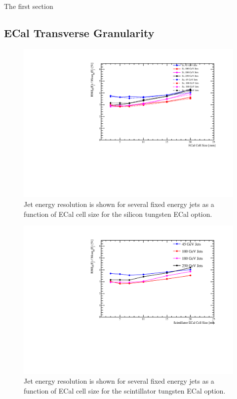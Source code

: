 The first section

\subsection{ECal Transverse Granularity}
\label{optstud:sec:ecal:cellsize}

\begin{figure}
  \includegraphics[width=\largefigwidth]{OptimisationStudies/Plots/JER_vs_SiliconECalCellSize.pdf}
  \caption[Jet energy resolution as a function of ECal cell size for the silicon tungsten ECal option.]{Jet energy resolution is shown for several fixed energy jets as a function of ECal cell size for the silicon tungsten ECal option.}
  \label{optstud:fig:siecalcells}
\end{figure}

\begin{figure}
  \includegraphics[width=\largefigwidth]{OptimisationStudies/Plots/JER_vs_ScintillatorECalCellSize.pdf}
  \caption[Jet energy resolution as a function of ECal cell size for the scintillator tungsten ECal option.]{Jet energy resolution is shown for several fixed energy jets as a function of ECal cell size for the scintillator tungsten ECal option.}
  \label{optstud:fig:scecalcells}
\end{figure}

